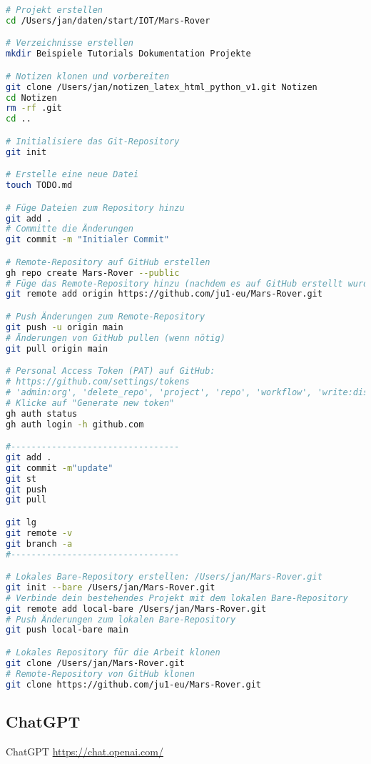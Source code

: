 \documentclass{vorlage-design-main}
\begin{document}
\begin{lstlisting}[language=bash]
# Projekt erstellen
cd /Users/jan/daten/start/IOT/Mars-Rover

# Verzeichnisse erstellen
mkdir Beispiele Tutorials Dokumentation Projekte

# Notizen klonen und vorbereiten
git clone /Users/jan/notizen_latex_html_python_v1.git Notizen
cd Notizen
rm -rf .git
cd ..

# Initialisiere das Git-Repository
git init

# Erstelle eine neue Datei
touch TODO.md

# Füge Dateien zum Repository hinzu
git add .
# Committe die Änderungen
git commit -m "Initialer Commit"

# Remote-Repository auf GitHub erstellen
gh repo create Mars-Rover --public
# Füge das Remote-Repository hinzu (nachdem es auf GitHub erstellt wurde)
git remote add origin https://github.com/ju1-eu/Mars-Rover.git

# Push Änderungen zum Remote-Repository
git push -u origin main
# Änderungen von GitHub pullen (wenn nötig)
git pull origin main

# Personal Access Token (PAT) auf GitHub:
# https://github.com/settings/tokens
# 'admin:org', 'delete_repo', 'project', 'repo', 'workflow', 'write:discussion'
# Klicke auf "Generate new token"
gh auth status
gh auth login -h github.com

#---------------------------------
git add .
git commit -m"update"
git st
git push
git pull

git lg
git remote -v
git branch -a
#---------------------------------

# Lokales Bare-Repository erstellen: /Users/jan/Mars-Rover.git
git init --bare /Users/jan/Mars-Rover.git
# Verbinde dein bestehendes Projekt mit dem lokalen Bare-Repository
git remote add local-bare /Users/jan/Mars-Rover.git
# Push Änderungen zum lokalen Bare-Repository
git push local-bare main

# Lokales Repository für die Arbeit klonen
git clone /Users/jan/Mars-Rover.git
# Remote-Repository von GitHub klonen
git clone https://github.com/ju1-eu/Mars-Rover.git
\end{lstlisting}

\hypertarget{chatgpt}{%
\subsection{ChatGPT}\label{chatgpt}}

ChatGPT \url{https://chat.openai.com/}
\end{document}
